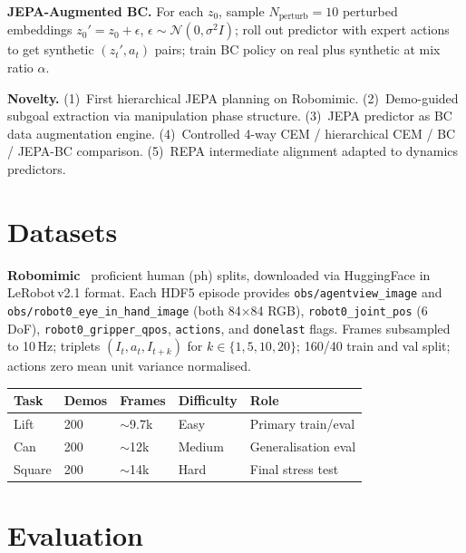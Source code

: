 \documentclass[10pt,twocolumn,letterpaper]{article}
\begin{document}
\noindent\textbf{JEPA-Augmented BC.}
For each $z_0$, sample $N_\text{perturb}{=}10$ perturbed embeddings $z_0'\!=\!z_0\!+\!\epsilon$, $\epsilon\!\sim\!\mathcal{N}(0,\sigma^2 I)$; roll out predictor with expert actions to get synthetic $(z_t',a_t)$ pairs; train BC policy on real plus synthetic at mix ratio $\alpha$.

\noindent\textbf{Novelty.}
(1)~First hierarchical JEPA planning on Robomimic. (2)~Demo-guided subgoal extraction via manipulation phase structure. (3)~JEPA predictor as BC data augmentation engine. (4)~Controlled 4-way CEM / hierarchical CEM / BC / JEPA-BC comparison. (5)~REPA intermediate alignment adapted to dynamics predictors.

\section{Datasets}

\noindent\textbf{Robomimic}~\cite{robomimic2021} proficient human (ph) splits, downloaded via HuggingFace in LeRobot\,v2.1 format.
Each HDF5 episode provides \texttt{obs/agentview\_image} and \texttt{obs/robot0\_eye\_in\_hand\_image} (both 84$\times$84 RGB), \texttt{robot0\_joint\_pos} (6 DoF), \texttt{robot0\_gripper\_qpos}, \texttt{actions}, and \texttt{donelast} flags.
Frames subsampled to 10\,Hz; triplets $(I_t,a_t,I_{t+k})$ for $k\!\in\!\{1,5,10,20\}$; 160/40 train and val split; actions zero mean unit variance normalised.

\begin{table}[h]\centering\small\setlength{\tabcolsep}{3pt}
\begin{tabular}{@{}lllll@{}}
\toprule
\textbf{Task} & \textbf{Demos} & \textbf{Frames} & \textbf{Difficulty} & \textbf{Role}\\
\midrule
Lift   & 200 & $\sim$9.7k & Easy   & Primary train/eval\\
Can    & 200 & $\sim$12k  & Medium & Generalisation eval\\
Square & 200 & $\sim$14k  & Hard   & Final stress test\\
\bottomrule
\end{tabular}
\end{table}

\section{Evaluation}
\end{document}
